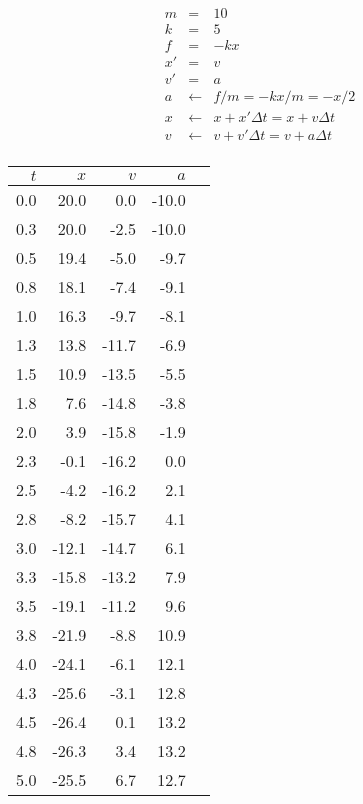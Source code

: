 \documentclass{beamer}
\newcommand{\dt}{\Delta t}
\begin{document}
\begin{minipage}{2in}
\begin{eqnarray*}
m &=& 10  \\
k &=& 5   \\
f &=& -kx \\
x' &=& v \\
v' &=& a \\
a &\leftarrow& f/m = -kx/m = -x/2 \\
x &\leftarrow& x + x'\dt = x + v \dt\\
v &\leftarrow& v + v'\dt = v + a \dt\\
\end{eqnarray*}
\end{minipage}
\hfill\begin{minipage}{2in}



{\scriptsize
\begin{tabular}{r|rrrr}
$t$ & $x$ & $v$ & $a$ \\\hline
0.0  &  20.0  &  0.0  &  -10.0  &  \\
0.3  &  20.0  &  -2.5  &  -10.0  &  \\
0.5  &  19.4  &  -5.0  &  -9.7  &  \\
0.8  &  18.1  &  -7.4  &  -9.1  &  \\
1.0  &  16.3  &  -9.7  &  -8.1  &  \\
1.3  &  13.8  &  -11.7  &  -6.9  &  \\
1.5  &  10.9  &  -13.5  &  -5.5  &  \\
1.8  &  7.6  &  -14.8  &  -3.8  &  \\
2.0  &  3.9  &  -15.8  &  -1.9  &  \\
2.3  &  -0.1  &  -16.2  &  0.0  &  \\
2.5  &  -4.2  &  -16.2  &  2.1  &  \\
2.8  &  -8.2  &  -15.7  &  4.1  &  \\
3.0  &  -12.1  &  -14.7  &  6.1  &  \\
3.3  &  -15.8  &  -13.2  &  7.9  &  \\
3.5  &  -19.1  &  -11.2  &  9.6  &  \\
3.8  &  -21.9  &  -8.8  &  10.9  &  \\
4.0  &  -24.1  &  -6.1  &  12.1  &  \\
4.3  &  -25.6  &  -3.1  &  12.8  &  \\
4.5  &  -26.4  &  0.1  &  13.2  &  \\
4.8  &  -26.3  &  3.4  &  13.2  &  \\
5.0  &  -25.5  &  6.7  &  12.7  &  \\
\end{tabular}
}



\end{minipage}
\end{document}

